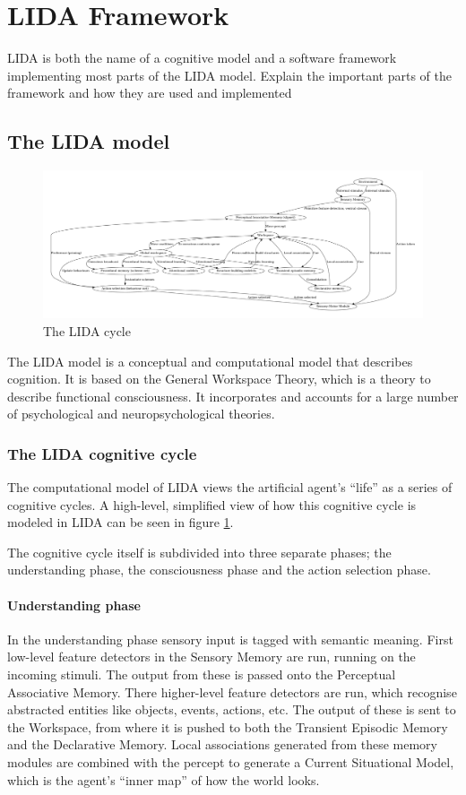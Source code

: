\section{LIDA Framework}
\label{sec:lida}
LIDA is both the name of a cognitive model and a software framework implementing
most parts of the LIDA model.
Explain the important parts of the framework and how they are used and implemented

\subsection{The LIDA model}
\begin{figure}[h!tb]
\centering
\includegraphics[angle=90, height=0.85\textheight]{graphics/lida-cycle.pdf}
\caption{The LIDA cycle}
\label{fig:lida-cycle}
\end{figure}

The LIDA model is a conceptual and computational model that describes cognition.
It is based on the General Workspace Theory, which is a theory to describe
functional consciousness. It incorporates and accounts for a large number of
psychological and neuropsychological theories.

\subsubsection{The LIDA cognitive cycle}
The computational model of LIDA views the artificial agent's ``life'' as a
series of cognitive cycles. A high-level, simplified view of how this cognitive
cycle is modeled in LIDA can be seen in figure \ref{fig:lida-cycle}.

The cognitive cycle itself is subdivided into three separate phases; the
understanding phase, the consciousness phase and the action selection phase.

\paragraph{Understanding phase}
In the understanding phase sensory input is tagged with semantic meaning. First
low-level feature detectors in the Sensory Memory are run, running on the
incoming stimuli. The output from these is passed onto the Perceptual
Associative Memory. There higher-level feature detectors are run, which
recognise abstracted entities like objects, events, actions, etc. The output of
these is sent to the Workspace, from where it is pushed to both the Transient
Episodic Memory and the Declarative Memory. Local associations generated from
these memory modules are combined with the percept to generate a Current
Situational Model, which is the agent's ``inner map'' of how the world looks.

